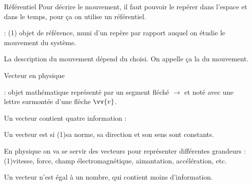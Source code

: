 \newpage
\vspace*{-34pt}
\begin{doc}{Référentiel}
  Pour décrire le mouvement, il faut pouvoir le repérer dans l’espace et dans le temps, pour ça on utilise un référentiel.
  
  \begin{importants}
     : \texteTrou(1){
      objet de référence, muni d'un repère par rapport auquel on étudie le mouvement du système.
    }
  \end{importants}
  
  \begin{importants}
    La description du mouvement dépend du  choisi.
    On appelle ça la  du mouvement.
  \end{importants}
\end{doc}



\vspace*{-8pt}
\begin{doc}{Vecteur en physique}
  \begin{importants}
     : objet mathématique représenté par un segment fléché $\longrightarrow$ et noté avec une lettre surmontée d'une flèche $\vv{v}$.
    
    Un vecteur contient quatre information : 
    \begin{listePoints}[2]
      \item {}
      \item {}
      \item {}
      \item {}
    \end{listePoints}
  
    Un vecteur est  si
    \texteTrou(1){sa norme, sa direction et son sens sont constants.}
  \end{importants}
  
  \fleche En physique on va se servir des vecteurs pour représenter différentes grandeurs :
  \texteTrou(1){vitesse, force, champ électromagnétique, aimantation, accélération, etc.}
  
  \attention Un vecteur n'est  égal à un nombre, qui contient moins d'information.
\end{doc}


